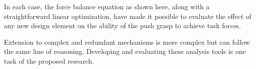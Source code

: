In each case, the force balance equation as shown here, along with a straightforward linear optimization, have made it possible to evaluate the effect of any new design element on the ability of the push grasp to achieve task forces.

Extension to complex and redundant mechanisms is more complex but can follow the same line of reasoning.   Developing and evaluating these analysis tools is one task of the proposed research.
